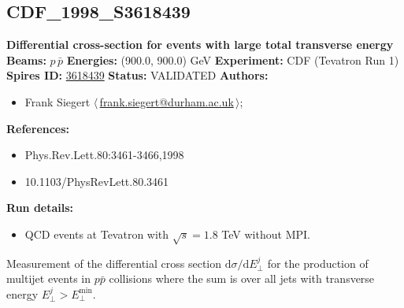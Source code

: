 \subsection[CDF\_1998\_S3618439]{CDF\_1998\_S3618439\,\cite{Abe:1997eua}}
\textbf{Differential cross-section for events with large total transverse energy}\newline
\textbf{Beams:} $p$\,$\bar{p}$ \newline
\textbf{Energies:} (900.0, 900.0) GeV \newline
\textbf{Experiment:} CDF (Tevatron Run 1) \newline
\textbf{Spires ID:} \href{http://www.slac.stanford.edu/spires/find/hep/www?rawcmd=key+3618439}{3618439}\newline
\textbf{Status:} VALIDATED\newline
\textbf{Authors:}
\begin{itemize}
  \item Frank Siegert $\langle\,$\href{mailto:frank.siegert@durham.ac.uk}{frank.siegert@durham.ac.uk}$\,\rangle$;
\end{itemize}
\textbf{References:}
\begin{itemize}
  \item Phys.Rev.Lett.80:3461-3466,1998
  \item 10.1103/PhysRevLett.80.3461
\end{itemize}
\textbf{Run details:}
\begin{itemize}

  \item QCD events at Tevatron with $\sqrt{s}=1.8$ TeV without MPI.\end{itemize}

\noindent Measurement of the differential cross section $\mathrm{d}\sigma/\mathrm{d}E_\perp^j$ for the production of multijet events in $p\bar{p}$ collisions where the sum is over all jets with transverse energy $E_\perp^j > E_\perp^\mathrm{min}$.

\clearpage


\clearpage

